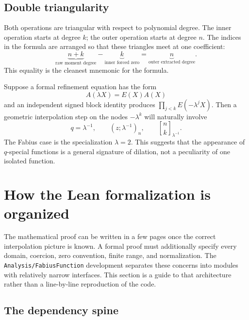 \documentclass[11pt,oneside]{article}
\theoremstyle{definition}
\theoremstyle{remark}
\newcommand{\qpoch}[3]{\left(#1;#2\right)_{#3}}
\newcommand{\qbinom}[3]{{\genfrac{[}{]}{0pt}{}{#1}{#2}}_{#3}}
\begin{document}
\subsection{Double triangularity}

Both operations are triangular with respect to polynomial degree.  The inner
operation starts at degree $k$; the outer operation starts at degree $n$.
The indices in the formula are arranged so that these triangles meet at one
coefficient:
\[
 \underbrace{n+k}_{\text{raw moment degree}}
 -\underbrace{k}_{\text{inner forced zero}}
 =\underbrace{n}_{\text{outer extracted degree}}.
\]
This equality is the cleanest mnemonic for the formula.

\begin{greenbox}
Suppose a formal refinement equation has the form
\[
 A(\lambda X)=E(X)A(X)
\]
and an independent signed block identity produces
$\prod_{j<k}E(-\lambda^jX)$.  Then a geometric interpolation step on the
nodes $-\lambda^k$ will naturally involve
\[
 q=\lambda^{-1},\qquad
 \qpoch{z}{\lambda^{-1}}{n},\qquad
 \qbinom{n}{k}{\lambda^{-1}}.
\]
The Fabius case is the specialization $\lambda=2$.  This suggests that the
appearance of $q$-special functions is a general signature of dilation, not
a peculiarity of one isolated function.
\end{greenbox}

\section{How the Lean formalization is organized}
\label{p3:sec:leanarchitecture}

The mathematical proof can be written in a few pages once the correct
interpolation picture is known.  A formal proof must additionally specify
every domain, coercion, zero convention, finite range, and normalization.
The \texttt{Analysis/FabiusFunction} development separates these concerns
into modules with relatively narrow interfaces.  This section is a guide to
that architecture rather than a line-by-line reproduction of the code.

\subsection{The dependency spine}
\end{document}
